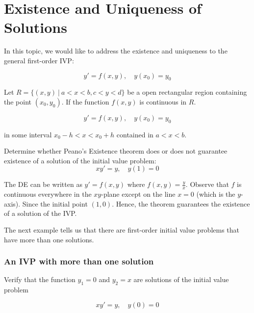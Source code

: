 \chapter{Existence and Uniqueness of Solutions}

In this topic, we would like to address the existence and uniqueness to the general 
first-order IVP:

\begin{equation}
    y' = f(x,y), \quad y(x_0) = y_0
\end{equation}

\begin{theorem}
    Let $R = \{(x,y) \> | \> a < x < b, c < y < d \}$ be a open rectangular 
    region containing the point $(x_0, y_0)$. If the function $f(x, y)$ 
    is continuous in $R$.

    \[
        y' = f(x,y), \quad y(x_0) = y_0
    \]

    

    in some interval $x_0 - h < x < x_0 + h$ contained in $a < x < b$.
\end{theorem}

\begin{example}
    Determine whether Peano's Existence theorem does or does not guarantee existence of a 
    solution of the initial value problem:
    \[
        xy' = y,\quad y(1) = 0
    \]
\end{example}
\begin{solution}
    The DE can be written as $y' = f(x,y)$ where $ f(x,y) = \frac{y}{x}$. 
    Observe that $f$ is continuous everywhere in the $xy$-plane except on the line 
    $x = 0$ (which is the $y$-axis). Since the initial point $(1, 0)$. Hence,
    the theorem guarantees the existence of a solution of the IVP.
\end{solution}

The next example tells us that there are first-order initial value problems that have 
more than one solutions.

\newpage

\subsection*{An IVP with more than one solution}

\begin{example}
    Verify that the function $y_1 = 0$ and $y_2 = x$ are solutions of the initial value problem

    \[
        xy' = y,\quad y(0) = 0
    \]
\end{example}

